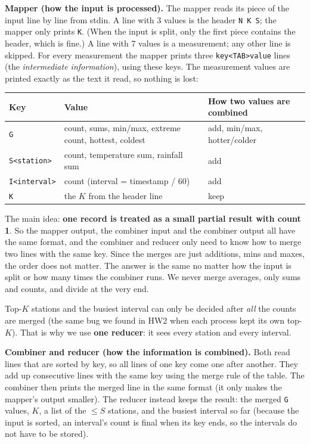 \documentclass[10pt,a4paper]{article}
\newcommand{\code}[1]{\texttt{#1}}
\begin{document}
\textbf{Mapper (how the input is processed).} The mapper reads its piece of the input line by line from stdin. A line with 3
values is the header \code{N K S}; the mapper only prints \code{K}. (When the input is split, only the first piece contains the
header, which is fine.) A line with 7 values is a measurement; any other line is skipped. For every measurement the mapper prints
three \code{key<TAB>value} lines (the \emph{intermediate information}), using these keys. The measurement values are printed exactly
as the text it read, so nothing is lost:

\begin{center}\small
\begin{tabular}{lll}
\toprule
Key & Value & How two values are combined \\
\midrule
\code{G} & count, sums, min/max, extreme count, hottest, coldest & add, min/max, hotter/colder \\
\code{S<station>} & count, temperature sum, rainfall sum & add \\
\code{I<interval>} & count (interval = timestamp / 60) & add \\
\code{K} & the $K$ from the header line & keep \\
\bottomrule
\end{tabular}
\end{center}

The main idea: \textbf{one record is treated as a small partial result with count 1}. So the mapper output, the combiner
input and the combiner output all have the same format, and the combiner and reducer only need to know how to merge two
lines with the same key. Since the merges are just additions, mins and maxes, the order does not matter. The answer is the
same no matter how the input is split or how many times the combiner runs. We never merge averages, only sums and counts,
and divide at the very end.

Top-$K$ stations and the busiest interval can only be decided after \emph{all} the counts are merged (the same bug we found in
HW2 when each process kept its own top-$K$). That is why we use \textbf{one reducer}: it sees every station and every interval.

\textbf{Combiner and reducer (how the information is combined).} Both read lines that are sorted by key, so all lines of one key
come one after another. They add up consecutive lines with the same key using the merge rule of the table. The combiner then
prints the merged line in the same format (it only makes the mapper's output smaller). The reducer instead keeps the result: the
merged \code{G} values, $K$, a list of the $\le S$ stations, and the busiest interval so far (because the input is sorted, an
interval's count is final when its key ends, so the intervals do not have to be stored).
\end{document}
